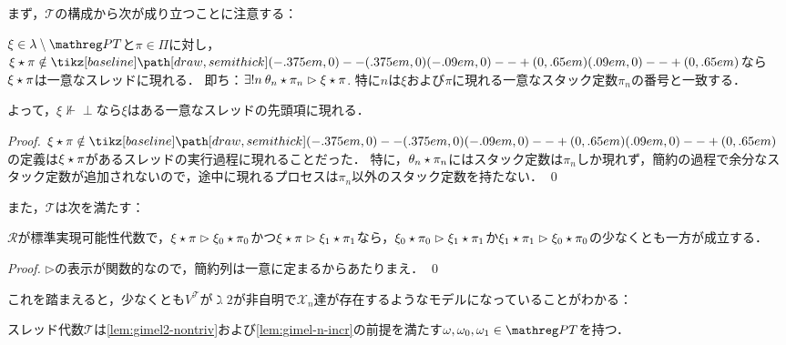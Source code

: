\documentclass[realisability.tex]{subfiles}
\begin{document}
まず，$\mathcal{T}$の構成から次が成り立つことに注意する：
\begin{lemma}\label{lem:uniq-thread}
 $\xi \in \lambda \setminus \PT$と$\pi \in \Pi$に対し，$\xi \cons \pi \notin \pole$なら$\xi \mathbin{\star} \pi$は一意なスレッドに現れる．
 即ち：$\exists! n \: \theta_n \mathbin{\star} \pi_n \mathrel{\rhd} \xi \mathbin{\star} \pi$.
 特に$n$は$\xi$および$\pi$に現れる一意なスタック定数$\pi_n$の番号と一致する．

 よって，$\xi \nVdash \perp$なら$\xi$はある一意なスレッドの先頭項に現れる．
\end{lemma}
\begin{proof}
 $\xi \cons \pi \notin \pole$の定義は$\xi \mathbin{\star} \pi$があるスレッドの実行過程に現れることだった．
 特に，$\theta_n \mathbin{\star} \pi_n$にはスタック定数は$\pi_n$しか現れず，簡約の過程で余分なスタック定数が追加されないので，途中に現れるプロセスは$\pi_n$以外のスタック定数を持たない． \qed
\end{proof}
また，$\mathcal{T}$は次を満たす：
\begin{theorem}\label{thm:strong-cr}
 $\mathcal{R}$が標準実現可能性代数で，$\xi \mathbin{\star} \pi \mathrel{\rhd} \xi_0 \mathbin{\star} \pi_0$かつ$\xi \mathbin{\star} \pi \mathrel{\rhd} \xi_1 \mathbin{\star} \pi_1$なら，$\xi_0 \mathbin{\star} \pi_0 \mathrel{\rhd} \xi_1 \mathbin{\star} \pi_1$か$\xi_1 \mathbin{\star} \pi_1 \mathrel{\rhd} \xi_0 \mathbin{\star} \pi_0$の少なくとも一方が成立する．
\end{theorem}
\begin{proof}
 $\rhd$の表示が関数的なので，簡約列は一意に定まるからあたりまえ． \qed
\end{proof}
これを踏まえると，少なくとも$V^{\mathcal{T}}$が$\gimel 2$が非自明で$\mathcal{X}_n$達が存在するようなモデルになっていることがわかる：
\begin{lemma}
 スレッド代数$\mathcal{T}$は\cref{lem:gimel2-nontriv}および\cref{lem:gimel-n-incr}の前提を満たす$\omega, \omega_0, \omega_1 \in \PT$を持つ．
\end{lemma}
\end{document}
